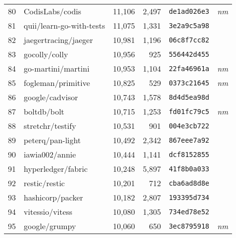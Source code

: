 {\begin{supertabular}{llrrll}
        80  &                    CodisLabs/codis & 11,106 &  2,497 &  \texttt{de1ad026e3} &  \textit{nm} \\
        81  &           quii/learn-go-with-tests & 11,075 &  1,331 &  \texttt{3e2a9c5a98} &              \\
        82  &               jaegertracing/jaeger & 10,981 &  1,196 &  \texttt{06c8f7cc82} &              \\
        83  &                      gocolly/colly & 10,956 &    925 &  \texttt{556442d455} &              \\
        84  &                 go-martini/martini & 10,953 &  1,104 &  \texttt{22fa46961a} &  \textit{nm} \\
        85  &                 fogleman/primitive & 10,825 &    529 &  \texttt{0373c21645} &  \textit{nm} \\
        86  &                    google/cadvisor & 10,743 &  1,578 &  \texttt{8d4d5ea98d} &              \\
        87  &                        boltdb/bolt & 10,715 &  1,253 &  \texttt{fd01fc79c5} &  \textit{nm} \\
        88  &                   stretchr/testify & 10,531 &    901 &  \texttt{004e3cb722} &              \\
        89  &                   peterq/pan-light & 10,492 &  2,342 &  \texttt{867eee7a92} &              \\
        90  &                     iawia002/annie & 10,444 &  1,141 &  \texttt{dcf8152855} &              \\
        91  &                 hyperledger/fabric & 10,248 &  5,897 &  \texttt{41f8b0a033} &              \\
        92  &                      restic/restic & 10,201 &    712 &  \texttt{cba6ad8d8e} &              \\
        93  &                   hashicorp/packer & 10,182 &  2,807 &  \texttt{193395d734} &              \\
        94  &                    vitessio/vitess & 10,080 &  1,305 &  \texttt{734ed78e52} &              \\
        95  &                      google/grumpy & 10,060 &    650 &  \texttt{3ec8795918} &  \textit{nm} \\

\end{supertabular}}
